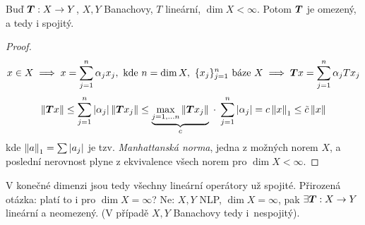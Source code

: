 \begin{theorem}
Buď $\boldsymbol{T}: X \to Y$, $X,Y$ Banachovy, $T$ lineární, $\dim X < \infty$. Potom $\boldsymbol{T}$ je omezený, a tedy i spojitý.
\end{theorem}
\begin{proof}
$$
    x \in X
    \implies
    x = \sum_{j=1}^n \alpha_j x_j, \text{ kde } n = \dim X, \text{ } \{ x_j \}_{j=1}^n \text{ báze } X
    \implies
    \boldsymbol{T}x = \sum_{j=1}^n \alpha_j T x_j
$$
$$
    \left\lVert\boldsymbol{T}x\right\rVert
    \leq
    \sum_{j=1}^n |\alpha_j| \left\lVert\boldsymbol{T}x_j\right\rVert
    \leq
    \underbrace{
        \underset{j=1,\dots n}{\max} \left\lVert\boldsymbol{T}x_j\right\rVert
    }_{c}
    \; \cdot \;
    \sum_{j=1}^n |\alpha_j|
    =
    c \left\lVert x\right\rVert_1
    \leq
    \Tilde{c} \left\lVert x\right\rVert
$$
kde $\left\lVert a\right\rVert_1 = \sum |a_j|$ je tzv. \textit{Manhattanská norma}, jedna z možných norem $X$, a poslední nerovnost plyne z ekvivalence všech norem pro $\dim X < \infty$.
\end{proof}

\begin{remark}
V konečné dimenzi jsou tedy všechny lineární operátory už spojité. Přirozená otázka: platí to i pro $\dim X = \infty$? Ne: $X, Y$ NLP, $\dim X = \infty$, pak $\exists \boldsymbol{T}: X \to Y$ lineární a neomezený. (V případě $X,Y$ Banachovy tedy i~nespojitý).
\end{remark}

